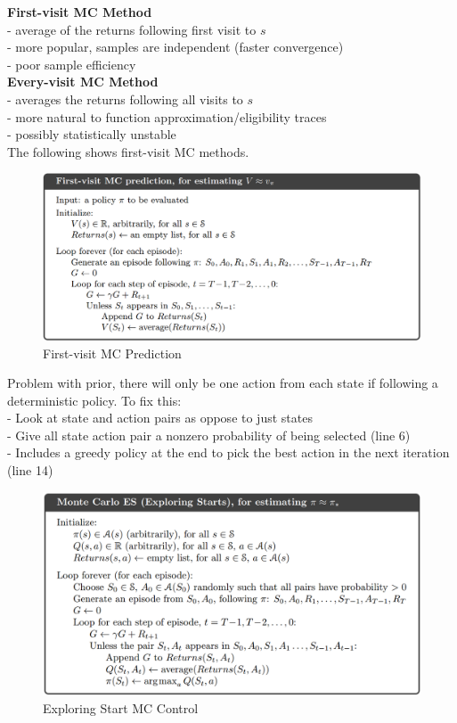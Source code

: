 \documentclass{article}
\begin{document}
\noindent
\textbf{First-visit MC Method}\\
- average of the returns following first visit to $s$\\
- more popular, samples are independent (faster convergence)\\
- poor sample efficiency\\

\noindent
\textbf{Every-visit MC Method}\\
- averages the returns following all visits to $s$\\
- more natural to function approximation/eligibility traces\\
- possibly statistically unstable\\

\noindent
The following shows first-visit MC methods.

\begin{figure}[h]
\includegraphics[scale=0.25]{firstvisit_mc}
\centering
\caption{First-visit MC Prediction}
\end{figure}

\noindent
Problem with prior, there will only be one action from each state if following
a deterministic policy. To fix this: \\
- Look at state and action pairs as oppose to just states\\
- Give all state action pair a nonzero probability of being selected (line 6)\\
- Includes a greedy policy at the end to pick the best action in the next
iteration (line 14)\\

\begin{figure}[h]
\includegraphics[scale=0.25]{exploringstart_mc}
\centering
\caption{Exploring Start MC Control}
\end{figure}
\end{document}
